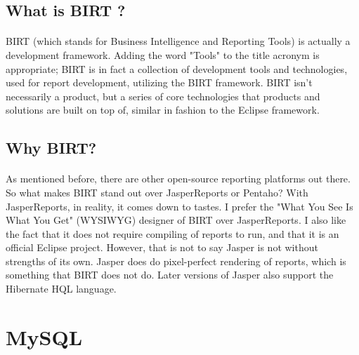 \subsection{What is BIRT ?}
\paragraph{}
BIRT (which stands for Business Intelligence and Reporting Tools) is actually a development 
framework. Adding the word "Tools" to the title acronym is appropriate; BIRT is in fact a 
collection of development tools and technologies, used for report development, utilizing the 
BIRT framework. BIRT isn't necessarily a product, but a series of core technologies that 
products and solutions are built on top of, similar in fashion to the Eclipse framework.

\subsection{Why BIRT?}
\paragraph{}
As mentioned before, there are other open-source reporting platforms out there.
So what makes BIRT stand out over JasperReports or Pentaho? With JasperReports,
in reality, it comes down to tastes. I prefer the "What You See Is What You Get"
(WYSIWYG) designer of BIRT over JasperReports. I also like the fact that it does
not require compiling of reports to run, and that it is an official Eclipse project.
However, that is not to say Jasper is not without strengths of its own. Jasper does do
pixel-perfect rendering of reports, which is something that BIRT does not do. Later
versions of Jasper also support the Hibernate HQL language.

\section{MySQL}

